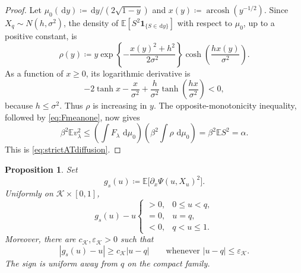 \documentclass[11pt]{article}
\newtheorem{proposition}[theorem]{Proposition}
\numberwithin{equation}{section}
\newcommand{\E}{\mathbb{E}}
\newcommand{\1}{\mathbf 1}
\newcommand{\cK}{\mathcal K}
\newcommand{\dd}{\,\mathrm d}
\begin{document}
\begin{proof}
Let $\mu_0(\dd y)\coloneqq\dd y/(2\sqrt{1-y})$ and
$x(y)\coloneqq\operatorname{arcosh}(y^{-1/2})$.  Since
$X_q\sim N(h,\sigma^2)$, the density of
$\E[S^2\1_{\{S\in\dd y\}}]$ with respect to $\mu_0$, up to a positive
constant, is
\[
 \rho(y)\coloneqq y\exp\left\{-\frac{x(y)^2+h^2}{2\sigma^2}\right\}
 \cosh\left(\frac{h x(y)}{\sigma^2}\right).
\]
As a function of $x\ge0$, its logarithmic derivative is
\[
 -2\tanh x-\frac{x}{\sigma^2}
 +\frac{h}{\sigma^2}\tanh\left(\frac{hx}{\sigma^2}\right)<0,
\]
because $h\le\sigma^2$.  Thus $\rho$ is increasing in $y$.
The opposite-monotonicity inequality, followed by
\eqref{eq:Fmeanone}, now gives
\[
 \beta^2\E v_\lambda^2
 \le\left(\int F_\lambda\,\dd\mu_0\right)
       \left(\beta^2\int\rho\,\dd\mu_0\right)
 =\beta^2\E S^2=\alpha.
\]
This is \eqref{eq:strictATdiffusion}.
\end{proof}


\begin{proposition}
\label{prop:pathRS}
Set
\[
 g_s(u)\coloneqq\E\bigl[\partial_x\Psi(u,X_u)^2\bigr].
\]
Uniformly on $\cK\times[0,1]$,
\begin{equation}
 g_s(u)-u
 \begin{cases}
 >0,&0\le u<q,\\
 =0,&u=q,\\
 <0,&q<u\le1.
 \end{cases}
 \label{eq:ATsign}
\end{equation}
Moreover, there are $c_{\cK},\varepsilon_{\cK}>0$ such that
\begin{equation}
 |g_s(u)-u|\ge c_{\cK}|u-q|
 \qquad\text{whenever }|u-q|\le\varepsilon_{\cK}.
 \label{eq:linearATsign}
\end{equation}
The sign is uniform away from $q$ on the compact family.
\end{proposition}
\end{document}
